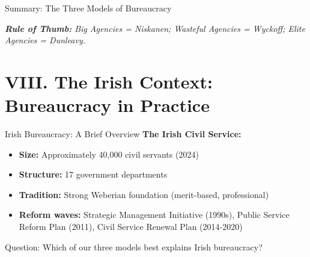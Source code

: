\documentclass[10pt]{beamer}
\begin{document}
\begin{frame}{Summary: The Three Models of Bureaucracy}
\centering
\renewcommand{\arraystretch}{1.5}
\vspace{0.5cm}

\small
\emph{\textbf{Rule of Thumb:} Big Agencies = Niskanen; Wasteful Agencies = Wyckoff; Elite Agencies = Dunleavy.}
\end{frame}

\section{VIII. The Irish Context: Bureaucracy in Practice}

\begin{frame}{Irish Bureaucracy: A Brief Overview}
\textbf{The Irish Civil Service:}

\begin{itemize}
\item \textbf{Size:} Approximately 40,000 civil servants (2024)
\item \textbf{Structure:} 17 government departments
\item \textbf{Tradition:} Strong Weberian foundation (merit-based, professional)
\item \textbf{Reform waves:} Strategic Management Initiative (1990s), Public Service Reform Plan (2011), Civil Service Renewal Plan (2014-2020)
\end{itemize}


\alert{Question:} Which of our three models best explains Irish bureaucracy?
\end{frame}
\end{document}
